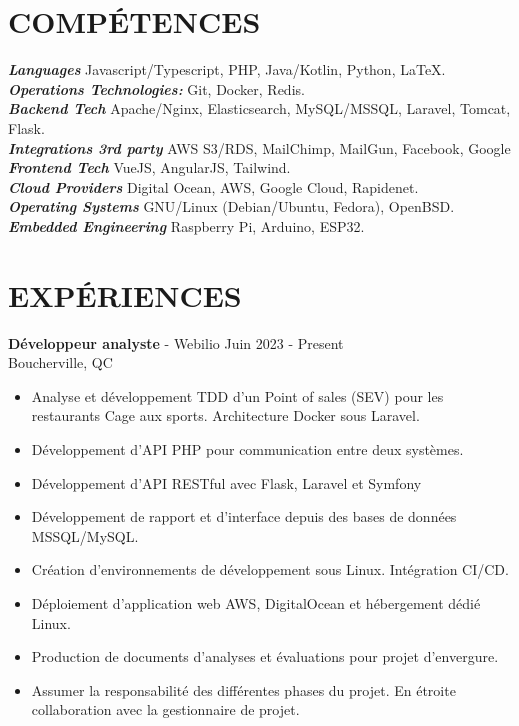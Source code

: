\documentclass[margin, 10pt]{res} %
\begin{document}
\begin{resume}


\section{COMPÉTENCES} 

{\sl \textbf{Languages}} Javascript/Typescript, PHP, Java/Kotlin, Python, \LaTeX. \\
{\sl \textbf{Operations Technologies:}} Git, Docker, Redis. \\
{\sl \textbf{Backend Tech}} Apache/Nginx, Elasticsearch, MySQL/MSSQL, Laravel, Tomcat, Flask. \\
{\sl \textbf{Integrations 3rd party}} AWS S3/RDS, MailChimp, MailGun, Facebook, Google \\
{\sl \textbf{Frontend Tech}} VueJS, AngularJS, Tailwind. \\
{\sl \textbf{Cloud Providers}} Digital Ocean, AWS, Google Cloud, Rapidenet. \\
{\sl \textbf{Operating Systems}} GNU/Linux (Debian/Ubuntu, Fedora), OpenBSD. \\
{\sl \textbf{Embedded Engineering}} Raspberry Pi, Arduino, ESP32. \\
 
 
\section{EXPÉRIENCES}

{\textbf{Développeur analyste} - Webilio} \hfill Juin 2023 - Present \\
Boucherville, QC
\begin{itemize}
\item Analyse et développement TDD d'un Point of sales (SEV) pour les restaurants Cage aux sports. Architecture Docker sous Laravel.
\item Développement d'API PHP pour communication entre deux systèmes.
\item Développement d'API RESTful avec Flask, Laravel et Symfony
\item Développement de rapport et d'interface depuis des bases de données MSSQL/MySQL.
\item Création d'environnements de développement sous Linux. Intégration CI/CD.
\item Déploiement d'application web AWS, DigitalOcean et hébergement dédié Linux.
\item Production de documents d'analyses et évaluations pour projet d'envergure.
\item Assumer la responsabilité des différentes phases du projet. En étroite collaboration avec la gestionnaire de projet.
\end{itemize}


\end{resume}
\end{document}
